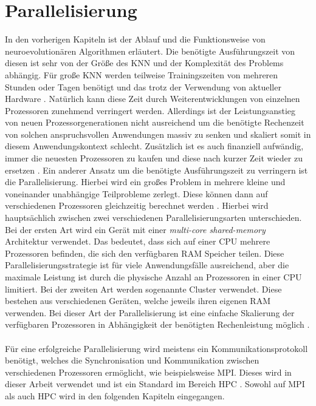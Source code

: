 \section{Parallelisierung}
In den vorherigen Kapiteln ist der Ablauf und die Funktionsweise von neuroevolutionären Algorithmen erläutert. Die benötigte Ausführungszeit von diesen ist sehr von der Größe des \ac{KNN} und der Komplexität des Problems abhängig. Für große \ac{KNN} werden teilweise Trainingszeiten von mehreren Stunden oder Tagen benötigt und das trotz der Verwendung von aktueller Hardware \cite{such2017deep}. Natürlich kann diese Zeit durch Weiterentwicklungen von einzelnen Prozessoren zunehmend verringert werden. Allerdings ist der Leistungsanstieg von neuen Prozessorgenerationen nicht ausreichend um die benötigte Rechenzeit von solchen anspruchsvollen Anwendungen massiv zu senken und skaliert somit in diesem Anwendungskontext schlecht. Zusätzlich ist es auch finanziell aufwändig, immer die neuesten Prozessoren zu kaufen und diese nach kurzer Zeit wieder zu ersetzen \cite{swann2002maximum}. Ein anderer Ansatz um die benötigte Ausführungszeit zu verringern ist die Parallelisierung. Hierbei wird ein großes Problem in mehrere kleine und voneinander unabhängige Teilprobleme zerlegt. Diese können dann auf verschiedenen Prozessoren gleichzeitig berechnet werden \cite{swann2002maximum}. Hierbei wird hauptsächlich zwischen zwei verschiedenen Parallelisierungsarten unterschieden. Bei der ersten Art wird ein Gerät mit einer \emph{multi-core shared-memory} Architektur verwendet. Das bedeutet, dass sich auf einer \ac{CPU} mehrere Prozessoren befinden, die sich den verfügbaren \ac{RAM} Speicher teilen. Diese Parallelisierungsstrategie ist für viele Anwendungsfälle ausreichend, aber die maximale Leistung ist durch die physische Anzahl an Prozessoren in einer \ac{CPU} limitiert. Bei der zweiten Art werden sogenannte Cluster verwendet. Diese bestehen aus verschiedenen Geräten, welche jeweils ihren eigenen \ac{RAM} verwenden. Bei dieser Art der Parallelisierung ist eine einfache Skalierung der verfügbaren Prozessoren in Abhängigkeit der benötigten Rechenleistung möglich \cite{nielsen2016introduction}. 
\\\\
Für eine erfolgreiche Parallelisierung wird meistens ein Kommunikationsprotokoll benötigt, welches die Synchronisation und Kommunikation zwischen verschiedenen Prozessoren ermöglicht, wie beispielsweise \ac{MPI}. Dieses wird in dieser Arbeit verwendet und ist ein Standard im Bereich \ac{HPC} \cite{nielsen2016introduction}. Sowohl auf \ac{MPI} als auch \ac{HPC} wird in den folgenden Kapiteln eingegangen.


